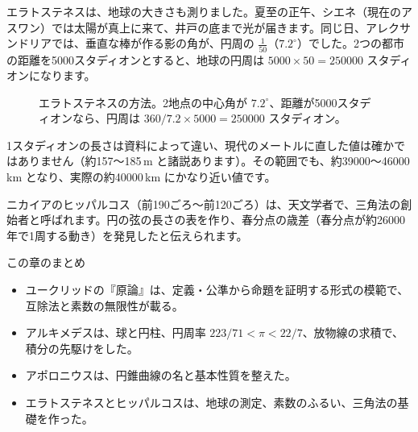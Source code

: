\documentclass[a4paper,11pt,openany]{ltjsbook}
\begin{document}
エラトステネスは、地球の大きさも測りました。夏至の正午、シエネ（現在のアスワン）では太陽が真上に来て、井戸の底まで光が届きます。同じ日、アレクサンドリアでは、垂直な棒が作る影の角が、円周の $\tfrac1{50}$（$7.2^\circ$）でした。2つの都市の距離を5000スタディオンとすると、地球の円周は $5000\times50=250000$ スタディオンになります。

\begin{figure}[htbp]
\centering
{}
\caption{エラトステネスの方法。2地点の中心角が $7.2^\circ$、距離が5000スタディオンなら、円周は $360/7.2\times5000=250000$ スタディオン。}
\end{figure}

1スタディオンの長さは資料によって違い、現代のメートルに直した値は確かではありません（約157〜185\,m と諸説あります）。その範囲でも、約39000〜46000\,km となり、実際の約40000\,km にかなり近い値です。

ニカイアのヒッパルコス（前190ごろ〜前120ごろ）は、天文学者で、三角法の創始者と呼ばれます。円の弦の長さの表を作り、春分点の歳差（春分点が約26000年で1周する動き）を発見したと伝えられます。

\begin{pointbox}{この章のまとめ}
\begin{itemize}[leftmargin=*]
\item ユークリッドの『原論』は、定義・公準から命題を証明する形式の模範で、互除法と素数の無限性が載る。
\item アルキメデスは、球と円柱、円周率 $223/71<\pi<22/7$、放物線の求積で、積分の先駆けをした。
\item アポロニウスは、円錐曲線の名と基本性質を整えた。
\item エラトステネスとヒッパルコスは、地球の測定、素数のふるい、三角法の基礎を作った。
\end{itemize}
\end{pointbox}
\end{document}
